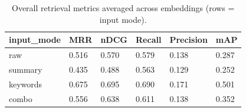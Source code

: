 \begin{table}
\caption{Overall retrieval metrics averaged across embeddings (rows = input mode).}
\label{tab:overview-by-input-mode}
\begin{tabular}{llllll}
\toprule
input_mode & MRR & nDCG & Recall & Precision & mAP \\
\midrule
raw & 0.516 & 0.570 & 0.579 & 0.138 & 0.287 \\
summary & 0.435 & 0.488 & 0.563 & 0.129 & 0.252 \\
keywords & 0.675 & 0.695 & 0.690 & 0.171 & 0.501 \\
combo & 0.556 & 0.638 & 0.611 & 0.138 & 0.352 \\
\bottomrule
\end{tabular}
\end{table}
